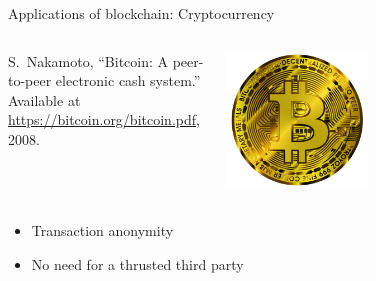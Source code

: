 \documentclass{beamer}
\begin{document}
\begin{frame}{Applications of blockchain: Cryptocurrency}
\begin{columns}
\begin{column}{0.5\textwidth}
   
{\footnotesize
\begin{thebibliography}{1}
S.~Nakamoto, ``Bitcoin: A peer-to-peer electronic cash system.'' Available at
  \href{https://bitcoin.org/bitcoin.pdf}{https://bitcoin.org/bitcoin.pdf},
  2008.
\end{thebibliography}  
}
\end{column}
\begin{column}{0.5\textwidth}  %
    \begin{center}
     \includegraphics[width=0.5\textwidth]{../../../Figures/bitcoin-6284869_1920.png}
     \end{center}
\end{column}
\end{columns}

\begin{itemize}
  \item Transaction anonymity
  \item No need for a thrusted third party
\end{itemize}
\end{frame}
\end{document}
